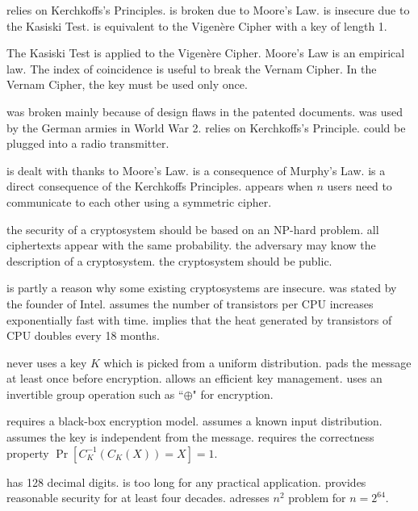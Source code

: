  {relies on Kerchkoffs's Principles. }
 {is broken due to Moore's Law.}
 {is insecure due to the Kasiski Test.}
 {is equivalent to the Vigen{\`e}re Cipher with a key of length 1. }
 
{The Kasiski Test is applied to the Vigen{\`e}re Cipher.}
{Moore's Law is an empirical law.}
{The index of coincidence is useful to break the Vernam Cipher.}
{In the Vernam Cipher, the key must be used only once. }

{was  broken mainly because of design flaws in the patented documents.}
{was used by the German armies in  World War 2.}
{relies on  Kerchkoffs's Principle.}
{could be plugged into a radio transmitter.} 

 {is dealt with thanks to  Moore's Law.}
 {is a consequence of  Murphy's Law.}
 {is a direct consequence of the Kerchkoffs Principles.}
 {appears when $n$ users need to communicate to each other using a symmetric cipher.}
 
 {the security of a cryptosystem should be based on an NP-hard problem.}
 {all ciphertexts appear with the same probability.}
 {the adversary may know the description of  a cryptosystem.}
 {the cryptosystem should be public.}
 
 {is partly a reason why some existing cryptosystems are insecure.}
 {was stated by the founder of Intel.}
 {assumes the number of transistors per CPU increases exponentially fast with time.}
 {implies that the heat generated by transistors of CPU doubles every 18 months.}
 
 {never uses a key $K$ which is picked from a  uniform distribution.}
 {pads the message at least once before encryption.}
 {allows an efficient key management.}
 {uses an invertible group operation such as ``$\oplus$" for encryption.}
 
 {requires a black-box encryption model.}
 {assumes a known input distribution.}
 {assumes the key is independent from the message.}
 {requires the correctness property $\Pr[C_K^{-1}(C_K(X))=X]=1$.}
 
 {has 128 decimal digits.}
 {is too long for any practical application.}
  {provides reasonable security for at least four decades.}
  {adresses $n^2$ problem for $n=2^{64}$.}
  
